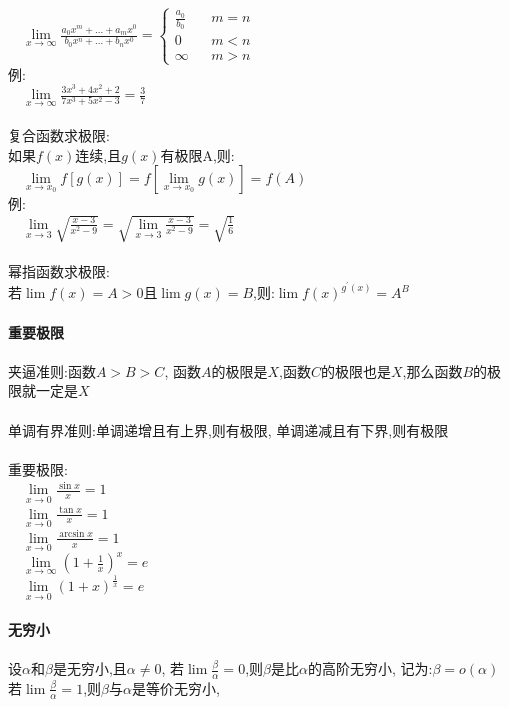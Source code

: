 \documentclass{article}
\begin{document}
\begin{flushleft}
	\ \ $\lim\limits_{x\to \infty} \frac{a_0x^m+...+a_mx^0}{b_0x^n+...+b_nx^0}=
	\left\{
	\begin{array}{rcl}
	\frac{a_0}{b_0} & & {m=n}\\
	0 & & {m<n}\\
	\infty & & {m>n}
	\end{array} \right.$\\
	例:\\
	\ \ $\lim\limits_{x\to \infty} \frac{3x^3+4x^2+2}{7x^3+5x^2-3} = \frac{3}{7}$\\
	~\\
	复合函数求极限:\\
	如果$f(x)$连续,且$g(x)$有极限A,则:\\
	\ \ $\lim\limits_{x\to x_0} f[g(x)]=f[\lim\limits_{x\to x_0}g(x)]=f(A)$\\
	例:\\
	\ \ $\lim\limits_{x\to 3} \sqrt{\frac{x-3}{x^2-9}}= \sqrt{\lim\limits_{x\to 3} \frac{x-3}{x^2-9}}=\sqrt{\frac{1}{6}}$\\
	~\\
	幂指函数求极限:\\
	若$\lim f(x)=A>0$且$\lim g(x)=B$,则:$\lim f(x)^{g^{'}(x)}=A^B$\\
	~\\ \textbf{重要极限}\\~\\
	夹逼准则:函数$A>B>C$, 函数$A$的极限是$X$,函数$C$的极限也是$X$,那么函数$B$的极限就一定是$X$\\
	~\\
	单调有界准则:单调递增且有上界,则有极限, 单调递减且有下界,则有极限\\
	~\\
	重要极限:\\
	\ \ $\lim\limits_{x\to 0} \frac{\sin x}{x}=1$\\
	\ \ $\lim\limits_{x\to 0} \frac{\tan x}{x}=1$\\
	\ \ $\lim\limits_{x\to 0} \frac{\arcsin x}{x}=1$\\
	\ \ $\lim\limits_{x\to \infty} (1+\frac{1}{x})^x=e$\\
	\ \ $\lim\limits_{x\to 0} (1+x)^{\frac{1}{x}}=e$\\
	~\\ \textbf{无穷小}\\~\\
	设$\alpha$和$\beta$是无穷小,且$\alpha \neq 0$,
	若$\lim \frac{\beta}{\alpha}=0$,则$\beta$是比$\alpha$的高阶无穷小,
	记为:$\beta = o(\alpha)$\\
	若$\lim \frac{\beta}{\alpha}=1$,则$\beta$与$\alpha$是等价无穷小,

\end{flushleft}
\end{document}
